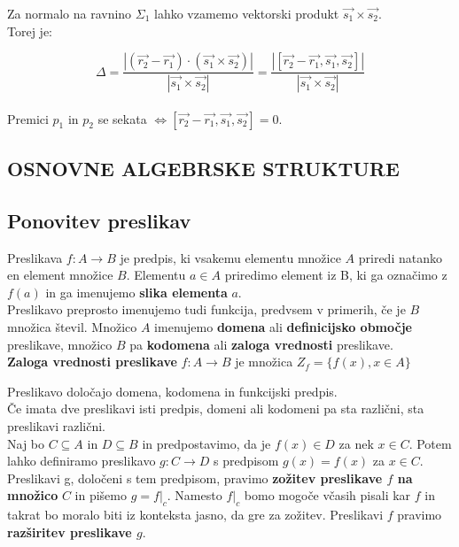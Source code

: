 \documentclass[a4paper,12pt]{article}
\begin{document}
\begin{itemize}
Za normalo na ravnino $\Sigma_1$ lahko vzamemo vektorski produkt $\vec{s_1} \times \vec{s_2}$. \\

Torej je: 

$$ \Delta = \frac{|(\vec{r_2}-\vec{r_1})\cdot(\vec{s_1} \times \vec{s_2})|}{|\vec{s_1} \times \vec{s_2}|} = \frac{|[\vec{r_2}-\vec{r_1},\vec{s_1},\vec{s_2}]|}{|\vec{s_1} \times \vec{s_2}|} $$ \\

Premici $p_1$ in $p_2$ se sekata $\Leftrightarrow [\vec{r_2}-\vec{r_1},\vec{s_1},\vec{s_2}]=0$.

\end{itemize}


\newpage

\begin{center}
\section{OSNOVNE ALGEBRSKE STRUKTURE}
\subsection{Ponovitev preslikav}
\end{center}

Preslikava $ f: A \to B $ je predpis, ki vsakemu elementu množice $A$ priredi natanko en element množice $B$. Elementu $a \in A$ priredimo element iz B, ki ga označimo z $f(a)$ in ga imenujemo \textbf{slika elementa} $a$. \\

Preslikavo preprosto imenujemo tudi funkcija, predvsem v primerih, če je $B$  množica števil. Množico $A$ imenujemo \textbf{domena} ali \textbf{definicijsko območje} preslikave, množico $B$ pa \textbf{kodomena} ali \textbf{zaloga vrednosti} preslikave. \\

\textbf{Zaloga vrednosti preslikave} $f: A \rightarrow B$ je množica $Z_f = \{f(x), x \in A\}$ 

Preslikavo določajo domena, kodomena in funkcijski predpis.\\

Če imata dve preslikavi isti predpis, domeni ali kodomeni pa sta različni, sta preslikavi različni. \\

Naj bo $C \subseteq A$ in $D \subseteq B$ in predpostavimo, da je $f(x) \in D$ za nek $x \in C$. Potem lahko definiramo preslikavo $g: C \to D$ s predpisom $g(x) = f(x)$ za $x \in C$. Preslikavi g, določeni s tem predpisom, pravimo \textbf{zožitev preslikave $f$ na množico} $C$ in pišemo $g = f|_c$. Namesto $f|_c$ bomo mogoče včasih pisali kar $f$ in takrat bo moralo biti iz konteksta jasno, da gre za zožitev. Preslikavi $f$ pravimo \textbf{razširitev preslikave $g$}. \\
\end{document}
